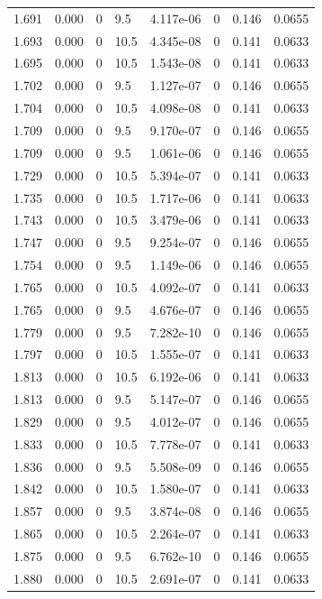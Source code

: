 \documentclass[preview]{standalone}
\begin{document}
{{{{{{\begin{tabular}{L{1.2cm}C{1.2cm} C{0.3cm}C{0.5cm} C{1.4cm}C{1.4cm} C{1.4cm}C{1.4cm}}
  1.691  &  0.000  & 0     & 9.5 &  4.117e-06  & 0  & 0.146 &  0.0655   \\ 
  1.693  &  0.000  & 0     & 10.5 &  4.345e-08  & 0  & 0.141 &  0.0633   \\ 
  1.695  &  0.000  & 0     & 10.5 &  1.543e-08  & 0  & 0.141 &  0.0633   \\ 
  1.702  &  0.000  & 0     & 9.5 &  1.127e-07  & 0  & 0.146 &  0.0655   \\ 
  1.704  &  0.000  & 0     & 10.5 &  4.098e-08  & 0  & 0.141 &  0.0633   \\ 
  1.709  &  0.000  & 0     & 9.5 &  9.170e-07  & 0  & 0.146 &  0.0655   \\ 
  1.709  &  0.000  & 0     & 9.5 &  1.061e-06  & 0  & 0.146 &  0.0655   \\ 
  1.729  &  0.000  & 0     & 10.5 &  5.394e-07  & 0  & 0.141 &  0.0633   \\ 
  1.735  &  0.000  & 0     & 10.5 &  1.717e-06  & 0  & 0.141 &  0.0633   \\ 
  1.743  &  0.000  & 0     & 10.5 &  3.479e-06  & 0  & 0.141 &  0.0633   \\ 
  1.747  &  0.000  & 0     & 9.5 &  9.254e-07  & 0  & 0.146 &  0.0655   \\ 
  1.754  &  0.000  & 0     & 9.5 &  1.149e-06  & 0  & 0.146 &  0.0655   \\ 
  1.765  &  0.000  & 0     & 10.5 &  4.092e-07  & 0  & 0.141 &  0.0633   \\ 
  1.765  &  0.000  & 0     & 9.5 &  4.676e-07  & 0  & 0.146 &  0.0655   \\ 
  1.779  &  0.000  & 0     & 9.5 &  7.282e-10  & 0  & 0.146 &  0.0655   \\ 
  1.797  &  0.000  & 0     & 10.5 &  1.555e-07  & 0  & 0.141 &  0.0633   \\ 
  1.813  &  0.000  & 0     & 10.5 &  6.192e-06  & 0  & 0.141 &  0.0633   \\ 
  1.813  &  0.000  & 0     & 9.5 &  5.147e-07  & 0  & 0.146 &  0.0655   \\ 
  1.829  &  0.000  & 0     & 9.5 &  4.012e-07  & 0  & 0.146 &  0.0655   \\ 
  1.833  &  0.000  & 0     & 10.5 &  7.778e-07  & 0  & 0.141 &  0.0633   \\ 
  1.836  &  0.000  & 0     & 9.5 &  5.508e-09  & 0  & 0.146 &  0.0655   \\ 
  1.842  &  0.000  & 0     & 10.5 &  1.580e-07  & 0  & 0.141 &  0.0633   \\ 
  1.857  &  0.000  & 0     & 9.5 &  3.874e-08  & 0  & 0.146 &  0.0655   \\ 
  1.865  &  0.000  & 0     & 10.5 &  2.264e-07  & 0  & 0.141 &  0.0633   \\ 
  1.875  &  0.000  & 0     & 9.5 &  6.762e-10  & 0  & 0.146 &  0.0655   \\ 
  1.880  &  0.000  & 0     & 10.5 &  2.691e-07  & 0  & 0.141 &  0.0633   \\ 
\hline 
\end{tabular} 

}}}}}}
\end{document}
